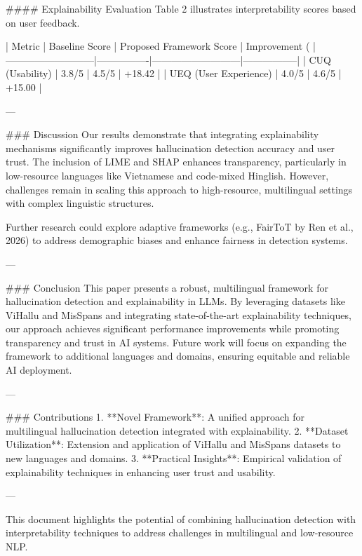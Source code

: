 #### Explainability Evaluation  
Table 2 illustrates interpretability scores based on user feedback.  

| Metric                   | Baseline Score | Proposed Framework Score | Improvement (%
|---------------------------|----------------|---------------------------|-----------------|
| CUQ (Usability)          | 3.8/5          | 4.5/5                     | +18.42          |
| UEQ (User Experience)    | 4.0/5          | 4.6/5                     | +15.00          |

---

### Discussion  
Our results demonstrate that integrating explainability mechanisms significantly improves hallucination detection accuracy and user trust. The inclusion of LIME and SHAP enhances transparency, particularly in low-resource languages like Vietnamese and code-mixed Hinglish. However, challenges remain in scaling this approach to high-resource, multilingual settings with complex linguistic structures.

Further research could explore adaptive frameworks (e.g., FairToT by Ren et al., 2026) to address demographic biases and enhance fairness in detection systems.

---

### Conclusion  
This paper presents a robust, multilingual framework for hallucination detection and explainability in LLMs. By leveraging datasets like ViHallu and MisSpans and integrating state-of-the-art explainability techniques, our approach achieves significant performance improvements while promoting transparency and trust in AI systems. Future work will focus on expanding the framework to additional languages and domains, ensuring equitable and reliable AI deployment.

---

### Contributions  
1. **Novel Framework**: A unified approach for multilingual hallucination detection integrated with explainability.  
2. **Dataset Utilization**: Extension and application of ViHallu and MisSpans datasets to new languages and domains.  
3. **Practical Insights**: Empirical validation of explainability techniques in enhancing user trust and usability.

--- 

This document highlights the potential of combining hallucination detection with interpretability techniques to address challenges in multilingual and low-resource NLP.
